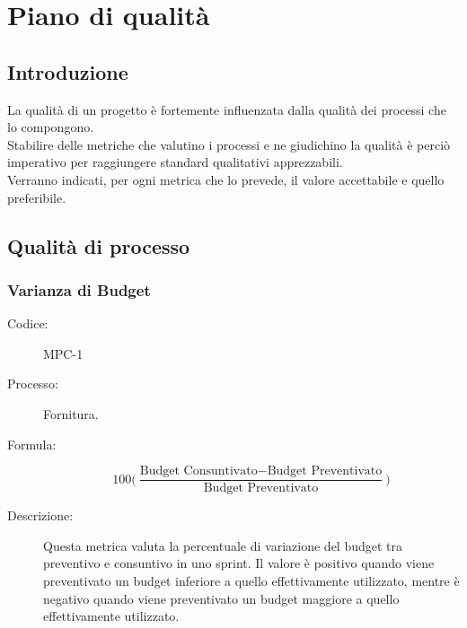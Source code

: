\chapter{Piano di qualità}

\section{Introduzione}
La qualità di un progetto è fortemente influenzata dalla qualità dei processi che lo compongono.\\ Stabilire delle metriche che valutino i processi e ne giudichino la qualità è perciò imperativo per raggiungere standard qualitativi apprezzabili.\\ Verranno indicati, per ogni metrica che lo prevede, il valore accettabile e quello preferibile.

\section{Qualità di processo} \label{sec:qualityproc}
\subsection{Varianza di Budget}
\begin{description}
    \item[Codice:] MPC-1
    \item[Processo:] Fornitura.
    \item[Formula:] 
    \begin{equation}
        100\biggl(\frac{\text{Budget Consuntivato} - \text{Budget Preventivato}}{\text{Budget Preventivato}}\biggr)
    \end{equation}
    \item[Descrizione:] Questa metrica valuta la percentuale di variazione del budget tra preventivo e consuntivo in uno sprint. Il valore è positivo quando viene preventivato un budget inferiore a quello effettivamente utilizzato, mentre è negativo quando viene preventivato un budget maggiore a quello effettivamente utilizzato.
\end{description}

